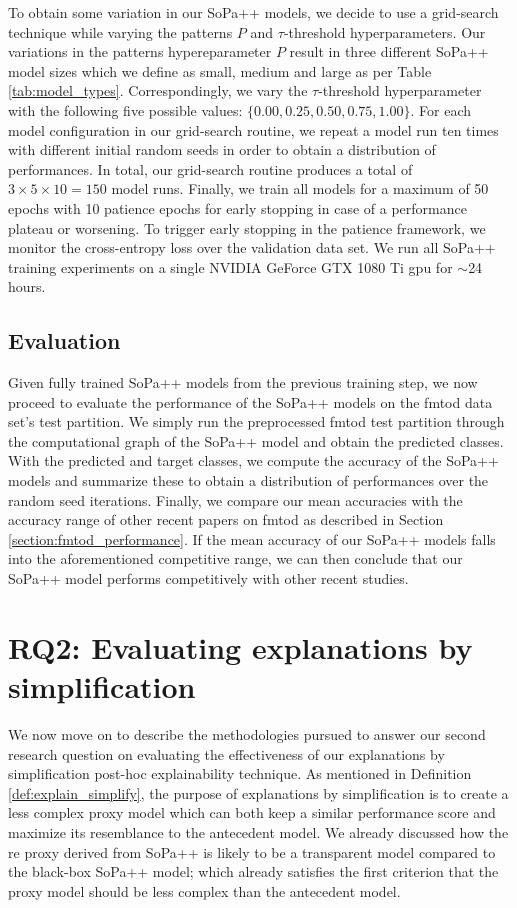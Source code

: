 To obtain some variation in our SoPa++ models, we decide to use a grid-search
technique while varying the patterns $P$ and $\tau$-threshold hyperparameters.
Our variations in the patterns hypereparameter $P$ result in three different
SoPa++ model sizes which we define as small, medium and large as per Table
\ref{tab:model_types}. Correspondingly, we vary the $\tau$-threshold
hyperparameter with the following five possible values: $\{0.00, 0.25, 0.50,
0.75, 1.00\}$. For each model configuration in our grid-search routine, we
repeat a model run ten times with different initial random seeds in order to
obtain a distribution of performances. In total, our grid-search routine
produces a total of $3\times5\times10=150$ model runs. Finally, we train all
models for a maximum of 50 epochs with 10 patience epochs for early stopping in
case of a performance plateau or worsening. To trigger early stopping in the
patience framework, we monitor the cross-entropy loss over the validation data
set. We run all SoPa++ training experiments on a single NVIDIA GeForce GTX 1080
Ti \ac{gpu} for $\sim$24 hours.

\subsection{Evaluation}

Given fully trained SoPa++ models from the previous training step, we now
proceed to evaluate the performance of the SoPa++ models on the \ac{fmtod} data set's
test partition. We simply run the preprocessed \ac{fmtod} test partition through the
computational graph of the SoPa++ model and obtain the predicted classes. With
the predicted and target classes, we compute the accuracy of the SoPa++ models
and summarize these to obtain a distribution of performances over the random
seed iterations. Finally, we compare our mean accuracies with the accuracy range
of other recent papers on \ac{fmtod} as described in Section
\ref{section:fmtod_performance}. If the mean accuracy of our SoPa++ models
falls into the aforementioned competitive range, we can then conclude that our
SoPa++ model performs competitively with other recent studies.

\section{RQ2: Evaluating explanations by simplification}

\label{section:evaluate_explain}

We now move on to describe the methodologies pursued to answer our second
research question on evaluating the effectiveness of our explanations by
simplification post-hoc explainability technique. As mentioned in Definition
\ref{def:explain_simplify}, the purpose of explanations by simplification is to
create a less complex proxy model which can both keep a similar performance
score and maximize its resemblance to the antecedent model. We already discussed
how the \ac{re} proxy derived from SoPa++ is likely to be a transparent model
compared to the black-box SoPa++ model; which already satisfies the first
criterion that the proxy model should be less complex than the antecedent model.

